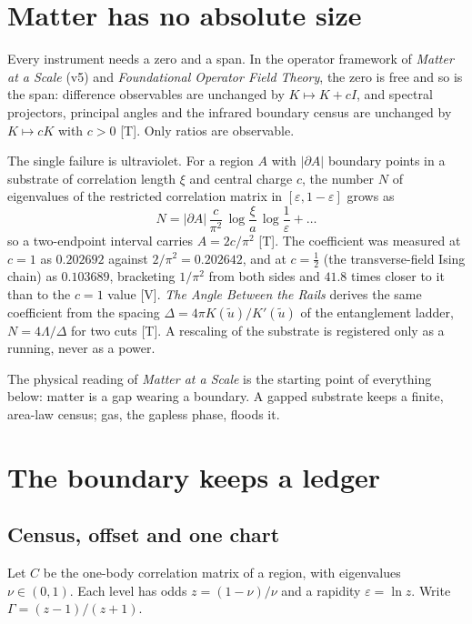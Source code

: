 \documentclass[11pt]{article}
\theoremstyle{definition}
\newcommand{\grade}[1]{\textsf{\small[#1]}}
\begin{document}
\section{Matter has no absolute size}
Every instrument needs a zero and a span. In the operator framework of \emph{Matter at a Scale} (v5) and \emph{Foundational Operator Field Theory}, the zero is free and so is the span: difference observables are unchanged by $K\mapsto K+cI$, and spectral projectors, principal angles and the infrared boundary census are unchanged by $K\mapsto cK$ with $c>0$ \grade{T}. Only ratios are observable.

The single failure is ultraviolet. For a region $A$ with $|\partial A|$ boundary points in a substrate of correlation length $\xi$ and central charge $c$, the number $N$ of eigenvalues of the restricted correlation matrix in $[\varepsilon,1-\varepsilon]$ grows as
\begin{equation}
N=|\partial A|\,\frac{c}{\pi^2}\,\log\frac{\xi}{a}\,\log\frac1\varepsilon+\dots
\label{eq:census}
\end{equation}
so a two-endpoint interval carries $A=2c/\pi^2$ \grade{T}. The coefficient was measured at $c=1$ as $0.202692$ against $2/\pi^2=0.202642$, and at $c=\tfrac12$ (the transverse-field Ising chain) as $0.103689$, bracketing $1/\pi^2$ from both sides and $41.8$ times closer to it than to the $c=1$ value \grade{V}. \emph{The Angle Between the Rails} derives the same coefficient from the spacing $\Delta=4\pi K(\tilde u)/K'(\tilde u)$ of the entanglement ladder, $N=4\Lambda/\Delta$ for two cuts \grade{T}. A rescaling of the substrate is registered only as a running, never as a power.

The physical reading of \emph{Matter at a Scale} is the starting point of everything below: matter is a gap wearing a boundary. A gapped substrate keeps a finite, area-law census; gas, the gapless phase, floods it.

\section{The boundary keeps a ledger}
\subsection{Census, offset and one chart}
Let $C$ be the one-body correlation matrix of a region, with eigenvalues $\nu\in(0,1)$. Each level has odds $z=(1-\nu)/\nu$ and a rapidity $\varepsilon=\ln z$. Write $\Gamma=(z-1)/(z+1)$.
\end{document}
